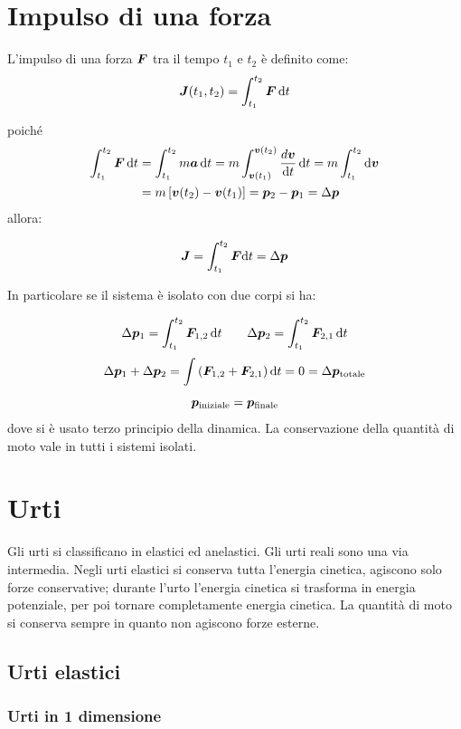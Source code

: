 \section{Impulso di una forza}
\begin{Def}
  L'impulso di una forza $\boldsymbol{F}$ tra il tempo $t_1$ e $t_2$ è definito come:
  \begin{equation}
    \boldsymbol{J}(t_1,t_2)=\int_{t_1}^{t_2} \boldsymbol{F}\, \mathrm{d} t
  \end{equation}
\end{Def}
poiché
\begin{align*}
  \int_{t_1}^{t_2} \boldsymbol{F}\, \mathrm{d} t & = \int_{t_1}^{t_2}m\boldsymbol{a}\, \mathrm{d} t=m\int_{\boldsymbol{v}(t_1)}^{\boldsymbol{v}(t_2)}\frac{d\boldsymbol{v}}{\mathrm{d} t}\,\mathrm{d} t=m\int_{t_1}^{t_2}\mathrm{d} \boldsymbol{v} \\
                                  & =m\left[\boldsymbol{v}(t_2)-\boldsymbol{v}(t_1)\right]=\boldsymbol{p}_2 - \boldsymbol{p}_1=\Delta \boldsymbol{p}
\end{align*}
allora:
\begin{Teo}[inpulso]
  \[
    \boldsymbol{J}=\int_{t_1}^{t_2}\boldsymbol{F} \mathrm{d} t=\Delta \boldsymbol{p}
  \]
\end{Teo}
In particolare se il sistema è isolato con due corpi si ha:

\[
  \Delta \boldsymbol{p}_1=\int_{t_1}^{t_2} \boldsymbol{F}_{1,2}\, \mathrm{d} t\qquad \Delta \boldsymbol{p}_2=\int_{t_1}^{t_2} \boldsymbol{F}_{2,1}\, \mathrm{d} t
\]
\[
  \Delta \boldsymbol{p}_1 + \Delta \boldsymbol{p}_2=\int\left(\boldsymbol{F}_{1,2}+\boldsymbol{F}_{2,1}\right)\mathrm{d} t=0=\Delta\boldsymbol{p}_{\text{totale}}
\]
\[
  \boldsymbol{p}_{\text{iniziale}}=\boldsymbol{p}_{\text{finale}}
\]
dove si è usato terzo principio della dinamica. La conservazione della quantità di moto vale in tutti i sistemi isolati.

\section{Urti}
Gli urti si classificano in elastici ed anelastici. Gli urti reali sono una via intermedia. Negli urti elastici si conserva tutta l'energia cinetica, agiscono solo forze conservative; durante l'urto l'energia cinetica si trasforma in energia potenziale, per poi tornare completamente energia cinetica. La quantità di moto si conserva sempre in quanto non agiscono forze esterne.

\subsection{Urti elastici}

\subsubsection{Urti in 1 dimensione}


